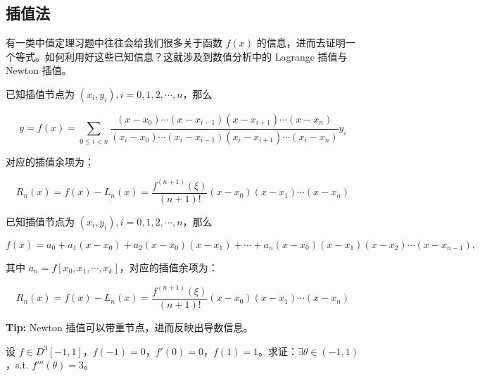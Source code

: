 \documentclass[lang=cn,10pt,thmcnt=section]{elegantbook}
\begin{document}
\subsection{插值法}
有一类中值定理习题中往往会给我们很多关于函数 $f(x)$ 的信息，进而去证明一个等式。如何利用好这些已知信息？这就涉及到数值分析中的 Lagrange 插值与 Newton 插值。
\begin{theorem}[Lagrange 插值]
	已知插值节点为 $(x_i, y_i), i = 0, 1, 2, \cdots, n$，那么

\[ y = f(x) = \sum_{0 \leq i < n} \frac{(x - x_0) \cdots (x - x_{i-1})(x - x_{i+1}) \cdots (x - x_n)}{(x_i - x_0) \cdots (x_i - x_{i-1})(x_i - x_{i+1}) \cdots (x_i - x_n)} y_i \]

对应的插值余项为：

\[ R_n(x) = f(x) - L_n(x) = \frac{f^{(n+1)}(\xi)}{(n+1)!}(x - x_0)(x - x_1) \cdots (x - x_n) \]

\end{theorem}
\begin{theorem}[Newton 插值]
	已知插值节点为 $(x_i, y_i), i = 0, 1, 2, \cdots, n$，那么

\[ f(x) = a_0 + a_1(x - x_0) + a_2(x - x_0)(x - x_1) + \cdots + a_n(x - x_0)(x - x_1)(x - x_2) \cdots (x - x_{n-1}), \]

其中 $a_n = f[x_0, x_1, \cdots, x_k]$，对应的插值余项为：

\[ R_n(x) = f(x) - L_n(x) = \frac{f^{(n+1)}(\xi)}{(n+1)!}(x - x_0)(x - x_1) \cdots (x - x_n) \]

\textbf{Tip:} Newton 插值可以带重节点，进而反映出导数信息。
\end{theorem}
\begin{example}
	设 $f \in D^3[-1, 1]$，$f(-1) = 0$，$f'(0) = 0$，$f(1) = 1$。求证：$\exists \theta \in (-1, 1)$，s.t. $f'''(\theta) = 3$。
\end{example}
\end{document}
